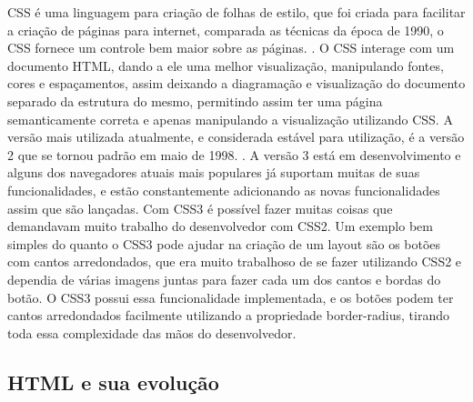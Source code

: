 CSS é uma linguagem para criação de folhas de estilo, que foi criada
para facilitar a criação de páginas para internet, comparada as técnicas da época de
1990, o CSS fornece um controle bem maior sobre as páginas. \cite{schmitt2009css}.
O CSS interage com um documento HTML, dando a ele uma melhor visualização, manipulando
fontes, cores e espaçamentos, assim deixando a diagramação e visualização do documento
separado da estrutura do mesmo, permitindo assim ter uma página semanticamente correta
e apenas manipulando a visualização utilizando CSS.
A versão mais utilizada atualmente, e considerada estável para utilização, é a versão 2
que se tornou padrão em maio de 1998. \cite{zeldman2009designing}.
A versão 3 está em desenvolvimento e alguns dos navegadores atuais mais populares
já suportam muitas de suas funcionalidades, e estão constantemente
adicionando as novas funcionalidades assim que são lançadas.
Com CSS3 é possível fazer muitas coisas que demandavam muito trabalho
do desenvolvedor com CSS2. Um exemplo bem simples do quanto o CSS3
pode ajudar na criação de um layout são os botões com cantos
arredondados, que era muito trabalhoso de se fazer utilizando CSS2 e
dependia de várias imagens juntas para fazer cada um dos cantos e
bordas do botão. O CSS3 possui essa funcionalidade implementada, e os
botões podem ter cantos arredondados facilmente utilizando a
propriedade border-radius, tirando toda essa complexidade das mãos do
desenvolvedor.

\subsection{HTML e sua evolução}


